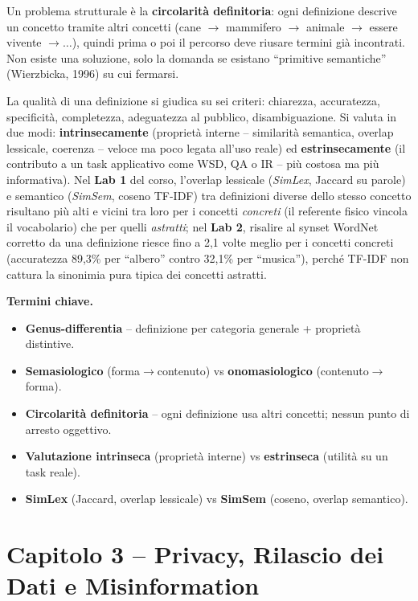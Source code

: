\documentclass[11pt,a4paper]{article}
\newcommand{\termini}{\medskip\noindent\textbf{\textcolor{blue!45!black}{Termini chiave.}}}
\begin{document}
Un problema strutturale \`e la \textbf{circolarit\`a definitoria}: ogni definizione descrive un concetto tramite altri concetti (cane $\to$ mammifero $\to$ animale $\to$ essere vivente $\to \ldots$), quindi prima o poi il percorso deve riusare termini gi\`a incontrati. Non esiste una soluzione, solo la domanda se esistano ``primitive semantiche'' (Wierzbicka, 1996) su cui fermarsi.

La qualit\`a di una definizione si giudica su sei criteri: chiarezza, accuratezza, specificit\`a, completezza, adeguatezza al pubblico, disambiguazione. Si valuta in due modi: \textbf{intrinsecamente} (propriet\`a interne -- similarit\`a semantica, overlap lessicale, coerenza -- veloce ma poco legata all'uso reale) ed \textbf{estrinsecamente} (il contributo a un task applicativo come WSD, QA o IR -- pi\`u costosa ma pi\`u informativa). Nel \textbf{Lab 1} del corso, l'overlap lessicale (\emph{SimLex}, Jaccard su parole) e semantico (\emph{SimSem}, coseno TF-IDF) tra definizioni diverse dello stesso concetto risultano pi\`u alti e vicini tra loro per i concetti \emph{concreti} (il referente fisico vincola il vocabolario) che per quelli \emph{astratti}; nel \textbf{Lab 2}, risalire al synset WordNet corretto da una definizione riesce fino a 2,1 volte meglio per i concetti concreti (accuratezza 89,3\% per ``albero'' contro 32,1\% per ``musica''), perch\'e TF-IDF non cattura la sinonimia pura tipica dei concetti astratti.

\termini
\begin{itemize}
\item \textbf{Genus-differentia} -- definizione per categoria generale + propriet\`a distintive.
\item \textbf{Semasiologico} (forma$\to$contenuto) vs \textbf{onomasiologico} (contenuto$\to$forma).
\item \textbf{Circolarit\`a definitoria} -- ogni definizione usa altri concetti; nessun punto di arresto oggettivo.
\item \textbf{Valutazione intrinseca} (propriet\`a interne) vs \textbf{estrinseca} (utilit\`a su un task reale).
\item \textbf{SimLex} (Jaccard, overlap lessicale) vs \textbf{SimSem} (coseno, overlap semantico).
\end{itemize}

\section*{Capitolo 3 -- Privacy, Rilascio dei Dati e Misinformation}
\end{document}
